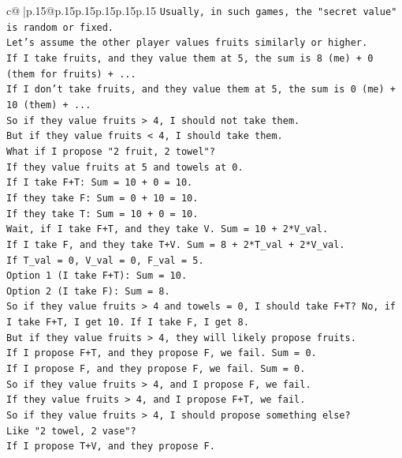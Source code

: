 \documentclass{article}
\begin{document}
{\begin{supertabular}{c@{$\;$}|p{.15\linewidth}@{}p{.15\linewidth}p{.15\linewidth}p{.15\linewidth}p{.15\linewidth}p{.15\linewidth}}
{{{\texttt{Usually, in such games, the "secret value" is random or fixed.} \\
\texttt{Let's assume the other player values fruits similarly or higher.} \\
\texttt{If I take fruits, and they value them at 5, the sum is 8 (me) + 0 (them for fruits) + ...} \\
\texttt{If I don't take fruits, and they value them at 5, the sum is 0 (me) + 10 (them) + ...} \\
\texttt{So if they value fruits > 4, I should not take them.} \\
\texttt{But if they value fruits < 4, I should take them.} \\
\texttt{What if I propose "2 fruit, 2 towel"?} \\
\texttt{If they value fruits at 5 and towels at 0.} \\
\texttt{If I take F+T: Sum = 10 + 0 = 10.} \\
\texttt{If they take F: Sum = 0 + 10 = 10.} \\
\texttt{If they take T: Sum = 10 + 0 = 10.} \\
\texttt{Wait, if I take F+T, and they take V. Sum = 10 + 2*V\_val.} \\
\texttt{If I take F, and they take T+V. Sum = 8 + 2*T\_val + 2*V\_val.} \\
\texttt{If T\_val = 0, V\_val = 0, F\_val = 5.} \\
\texttt{Option 1 (I take F+T): Sum = 10.} \\
\texttt{Option 2 (I take F): Sum = 8.} \\
\texttt{So if they value fruits > 4 and towels = 0, I should take F+T? No, if I take F+T, I get 10. If I take F, I get 8.} \\
\texttt{But if they value fruits > 4, they will likely propose fruits.} \\
\texttt{If I propose F+T, and they propose F, we fail. Sum = 0.} \\
\texttt{If I propose F, and they propose F, we fail. Sum = 0.} \\
\texttt{So if they value fruits > 4, and I propose F, we fail.} \\
\texttt{If they value fruits > 4, and I propose F+T, we fail.} \\
\texttt{So if they value fruits > 4, I should propose something else?} \\
\texttt{Like "2 towel, 2 vase"?} \\
\texttt{If I propose T+V, and they propose F.} \\
}}}
\end{supertabular}}
\end{document}
